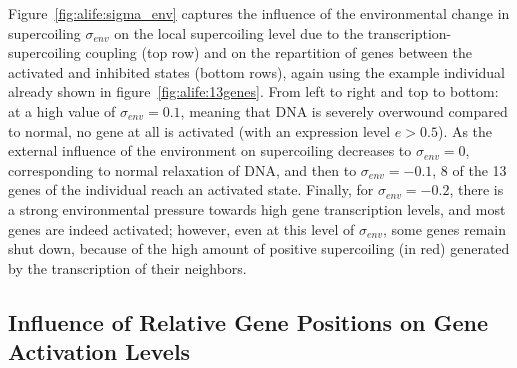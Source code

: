 Figure~\ref{fig:alife:sigma_env} captures the influence of the environmental change in supercoiling $\sigma_{env}$ on the local supercoiling level due to the transcription-supercoiling coupling (top row) and on the repartition of genes between the activated and inhibited states (bottom rows), again using the example individual already shown in figure~\ref{fig:alife:13genes}.
From left to right and top to bottom: at a high value of $\sigma_{env} = 0.1$, meaning that DNA is severely overwound compared to normal, no gene at all is activated (with an expression level $e > 0.5$).
As the external influence of the environment on supercoiling decreases to $\sigma_{env} = 0$, corresponding to normal relaxation of DNA, and then to $\sigma_{env} = -0.1$, 8 of the 13 genes of the individual reach an activated state.
Finally, for $\sigma_{env} = -0.2$, there is a strong environmental pressure towards high gene transcription levels, and most genes are indeed activated; however, even at this level of $\sigma_{env}$, some genes remain shut down, because of the high amount of positive supercoiling (in red) generated by the transcription of their neighbors.


\subsection{Influence of Relative Gene Positions on Gene Activation Levels}
\label{sec:alife:gene_pos}

